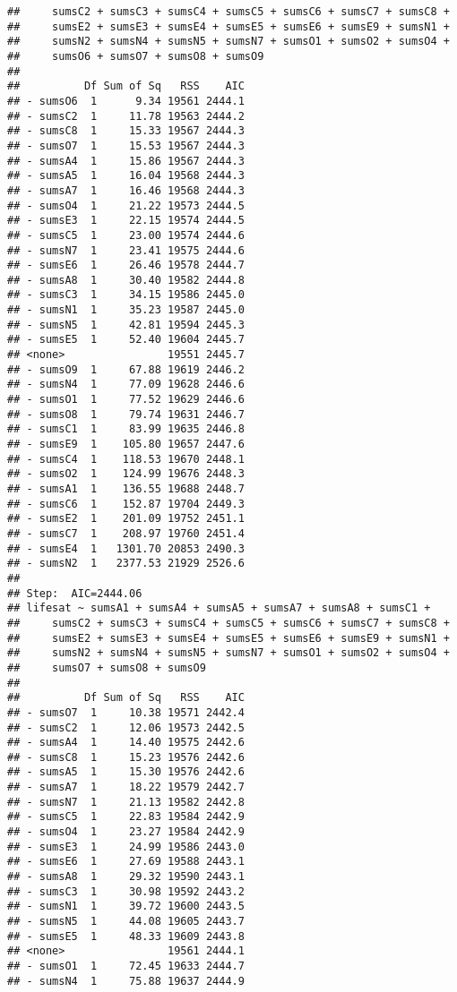 \documentclass[,man,floatsintext]{apa6}
\begin{document}
\begin{verbatim}
##     sumsC2 + sumsC3 + sumsC4 + sumsC5 + sumsC6 + sumsC7 + sumsC8 + 
##     sumsE2 + sumsE3 + sumsE4 + sumsE5 + sumsE6 + sumsE9 + sumsN1 + 
##     sumsN2 + sumsN4 + sumsN5 + sumsN7 + sumsO1 + sumsO2 + sumsO4 + 
##     sumsO6 + sumsO7 + sumsO8 + sumsO9
## 
##          Df Sum of Sq   RSS    AIC
## - sumsO6  1      9.34 19561 2444.1
## - sumsC2  1     11.78 19563 2444.2
## - sumsC8  1     15.33 19567 2444.3
## - sumsO7  1     15.53 19567 2444.3
## - sumsA4  1     15.86 19567 2444.3
## - sumsA5  1     16.04 19568 2444.3
## - sumsA7  1     16.46 19568 2444.3
## - sumsO4  1     21.22 19573 2444.5
## - sumsE3  1     22.15 19574 2444.5
## - sumsC5  1     23.00 19574 2444.6
## - sumsN7  1     23.41 19575 2444.6
## - sumsE6  1     26.46 19578 2444.7
## - sumsA8  1     30.40 19582 2444.8
## - sumsC3  1     34.15 19586 2445.0
## - sumsN1  1     35.23 19587 2445.0
## - sumsN5  1     42.81 19594 2445.3
## - sumsE5  1     52.40 19604 2445.7
## <none>                19551 2445.7
## - sumsO9  1     67.88 19619 2446.2
## - sumsN4  1     77.09 19628 2446.6
## - sumsO1  1     77.52 19629 2446.6
## - sumsO8  1     79.74 19631 2446.7
## - sumsC1  1     83.99 19635 2446.8
## - sumsE9  1    105.80 19657 2447.6
## - sumsC4  1    118.53 19670 2448.1
## - sumsO2  1    124.99 19676 2448.3
## - sumsA1  1    136.55 19688 2448.7
## - sumsC6  1    152.87 19704 2449.3
## - sumsE2  1    201.09 19752 2451.1
## - sumsC7  1    208.97 19760 2451.4
## - sumsE4  1   1301.70 20853 2490.3
## - sumsN2  1   2377.53 21929 2526.6
## 
## Step:  AIC=2444.06
## lifesat ~ sumsA1 + sumsA4 + sumsA5 + sumsA7 + sumsA8 + sumsC1 + 
##     sumsC2 + sumsC3 + sumsC4 + sumsC5 + sumsC6 + sumsC7 + sumsC8 + 
##     sumsE2 + sumsE3 + sumsE4 + sumsE5 + sumsE6 + sumsE9 + sumsN1 + 
##     sumsN2 + sumsN4 + sumsN5 + sumsN7 + sumsO1 + sumsO2 + sumsO4 + 
##     sumsO7 + sumsO8 + sumsO9
## 
##          Df Sum of Sq   RSS    AIC
## - sumsO7  1     10.38 19571 2442.4
## - sumsC2  1     12.06 19573 2442.5
## - sumsA4  1     14.40 19575 2442.6
## - sumsC8  1     15.23 19576 2442.6
## - sumsA5  1     15.30 19576 2442.6
## - sumsA7  1     18.22 19579 2442.7
## - sumsN7  1     21.13 19582 2442.8
## - sumsC5  1     22.83 19584 2442.9
## - sumsO4  1     23.27 19584 2442.9
## - sumsE3  1     24.99 19586 2443.0
## - sumsE6  1     27.69 19588 2443.1
## - sumsA8  1     29.32 19590 2443.1
## - sumsC3  1     30.98 19592 2443.2
## - sumsN1  1     39.72 19600 2443.5
## - sumsN5  1     44.08 19605 2443.7
## - sumsE5  1     48.33 19609 2443.8
## <none>                19561 2444.1
## - sumsO1  1     72.45 19633 2444.7
## - sumsN4  1     75.88 19637 2444.9

\end{verbatim}
\end{document}
